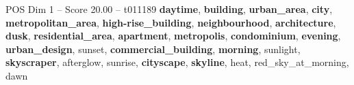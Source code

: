\begin{textsample}{POS Dim 1 – Score 20.00 – t011189}  \label{ex:f1_pos_018}
\textbf{daytime}, \textbf{building}, \textbf{urban\_area}, \textbf{city}, \textbf{metropolitan\_area}, \textbf{high-rise\_building}, \textbf{neighbourhood}, \textbf{architecture}, \textbf{dusk}, \textbf{residential\_area}, \textbf{apartment}, \textbf{metropolis}, \textbf{condominium}, \textbf{evening}, \textbf{urban\_design}, sunset, \textbf{commercial\_building}, \textbf{morning}, sunlight, \textbf{skyscraper}, afterglow, sunrise, \textbf{cityscape}, \textbf{skyline}, heat, red\_sky\_at\_morning, dawn

\end{textsample}

